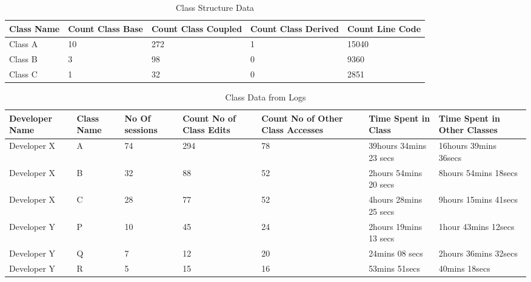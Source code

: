 \begin{center}
\begin{table*}[t]
	\centering
	\caption{Class Structure Data}
	\begin{tabular}{|l|l|l|l|l|}
	\hline

Class Name & Count Class Base & Count Class Coupled & Count Class Derived & Count Line Code\\
\hline\hline
Class A & 10 & 272 & 1 & 15040\\
\hline
Class B & 3 & 98 & 0 & 9360\\
\hline
Class C & 1 & 32 & 0 & 2851\\
\hline

	\end{tabular}
	\label{fig:ClassStructureAnalysisData}
\end{table*}
\end{center}

\begin{center}
\begin{table*}[t]
	\centering
	\caption{Class Data from Logs}
	\begin{tabular}{|l|l|l|l|l|l|l|}
	\hline

Developer Name & Class Name & No Of sessions &Count No of Class Edits & Count No of Other Class Accesses & Time Spent in Class & Time Spent in Other Classes\\
\hline\hline
Developer X & A & 74 & 294 & 78 & 39hours 34mins 23 secs & 16hours 39mins 36secs\\
\hline
Developer X & B & 32 & 88 & 52 & 2hours 54mins 20 secs & 8hours 54mins 18secs\\
\hline
Developer X & C & 28 & 77 & 52 & 4hours 28mins 25 secs & 9hours 15mins 41secs\\
\hline
Developer Y & P & 10 & 45 & 24 & 2hours 19mins 13 secs & 1hour 43mins 12secs\\
\hline
Developer Y & Q & 7 & 12 & 20 & 24mins 08 secs & 2hours 36mins 32secs\\
\hline
Developer Y & R & 5 & 15 & 16 & 53mins 51secs & 40mins 18secs\\
\hline

	\end{tabular}
	\label{fig:ClassAnalysisData}
\end{table*}
\end{center}

